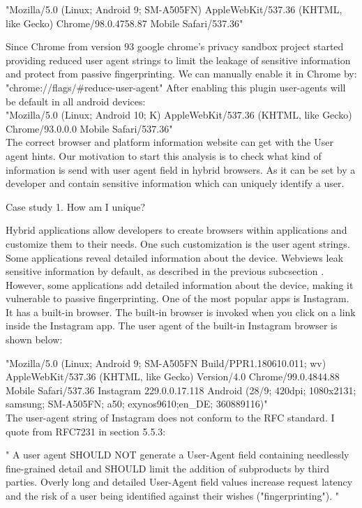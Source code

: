                 "{Mozilla/5.0 (Linux; Android 9; SM-A505FN) AppleWebKit/537.36 (KHTML,                like Gecko) Chrome/98.0.4758.87 Mobile Safari/537.36}" \\
\par
 Since Chrome from version 93 google chrome's privacy sandbox project started providing reduced user agent strings to limit the leakage of sensitive information and protect from passive fingerprinting. We can manually enable it in Chrome by: "{chrome://flags/#reduce-user-agent}"
After enabling this plugin user-agents will be default in all android devices:\\

       "{Mozilla/5.0 (Linux; Android 10; K) AppleWebKit/537.36 (KHTML, like  Gecko) Chrome/93.0.0.0 Mobile Safari/537.36}" \\
       
The correct browser and platform information website can get with the User agent hints\cite{useragentred}.
Our motivation to start this analysis is to check what kind of information is send with user agent field in hybrid browsers. As it can be set by a developer and contain sensitive information which can uniquely identify a user. 

Case study 1. How am I unique?\par
Hybrid applications allow developers to create browsers within applications and customize them to their needs. One such customization is the user agent strings. Some applications reveal detailed information about the device. Webviews leak sensitive information by default, as described in the previous subcsection . However, some applications add detailed information about the device, making it vulnerable to passive fingerprinting. One of the most popular apps is Instagram. It has a built-in browser. The built-in browser is invoked when you click on a link inside the Instagram app. The user agent of the built-in Instagram browser is shown below:\par

           {"Mozilla/5.0 (Linux; Android 9; SM-A505FN Build/PPR1.180610.011; wv) AppleWebKit/537.36 (KHTML, like Gecko) Version/4.0  Chrome/99.0.4844.88 Mobile Safari/537.36 Instagram 229.0.0.17.118  Android (28/9; 420dpi; 1080x2131;           samsung; SM-A505FN; a50; exynos9610;en\_DE; 360889116)"}
\\
The user-agent string of Instagram does not conform to the RFC standard. I quote from RFC7231 in section 5.5.3\cite{rfc}:

    {" A user agent SHOULD NOT generate a User-Agent field  containing needlessly fine-grained detail and SHOULD limit the addition of  subproducts by third parties.  Overly long and detailed User-Agent  field values increase request latency and the risk of a user being identified against their wishes ("fingerprinting"). "}


